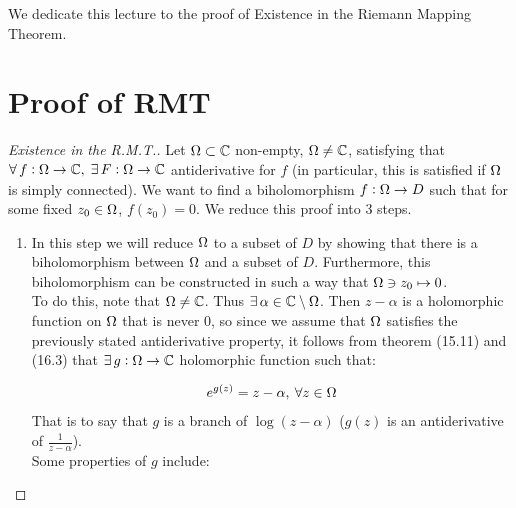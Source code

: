 \setcounter{section}{0}
\setcounter{theorem}{0}



We dedicate this lecture to the proof of Existence in the Riemann Mapping Theorem.\\

\section{Proof of RMT}


\begin{proof}[Existence in the R.M.T.]
Let $\Omega \subset \mathbb{C}$ non-empty, $\Omega \neq \mathbb{C}$, satisfying that $\forall \, f:\Omega \rightarrow \mathbb{C}, \; \exists \, F: \Omega \to \mathbb{C}$ antiderivative for $f$ (in particular, this is satisfied if $\Omega $ is simply connected). We want to find a biholomorphism $f:\Omega \to D$ such that for some fixed $z_0 \in \Omega$, $f(z_0) = 0$. We reduce this proof into 3 steps.

\begin{enumerate}

\subsection{Step 1}

    \item In this step we will reduce $\Omega$ to a subset of $D$ by showing that there is a biholomorphism between $\Omega$ and a subset of $D$. Furthermore, this biholomorphism can be constructed in such a way that $\Omega \ni z_0 \mapsto 0$. \\
    
    To do this, note that $\Omega \neq \mathbb{C}$. Thus $\exists \, \alpha \in \mathbb{C} \setminus \Omega$. Then $z- \alpha$ is a holomorphic function on $\Omega$ that is never $0$, so since we assume that $\Omega$ satisfies the previously stated antiderivative property, it follows from theorem (15.11) and (16.3) that $\exists \, g: \Omega \to \mathbb{C}$ holomorphic function such that:
    
    \begin{align*}
        e^{g(z)} = z - \alpha, \: \forall z \in \Omega
    \end{align*}
    That is to say that $g$ is a branch of $\log(z-\alpha)$ ($g(z)$ is an antiderivative of $\frac{1}{z-\alpha}$).\\
    
    Some properties of $g$ include:
    

\end{enumerate}
\end{proof}
